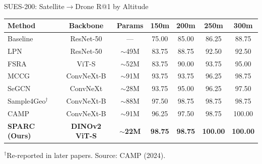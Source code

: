 \documentclass[aspectratio=169, 11pt]{beamer}
\begin{document}
\begin{frame}{SUES-200: Satellite$\to$Drone R@1 by Altitude}
\footnotesize
\centering
\begin{tabular}{@{}l c c c c c c@{}}
  \toprule
  \textbf{Method} & \textbf{Backbone} & \textbf{Params} & \textbf{150m} & \textbf{200m} & \textbf{250m} & \textbf{300m} \\
  \midrule
  Baseline & ResNet-50 & --- & 75.00 & 85.00 & 86.25 & 88.75 \\
  LPN & ResNet-50 & $\sim$49M & 83.75 & 88.75 & 92.50 & 92.50 \\
  FSRA & ViT-S & $\sim$52M & 83.75 & 90.00 & 93.75 & 95.00 \\
  MCCG & ConvNeXt-B & $\sim$91M & 93.75 & 93.75 & 96.25 & 98.75 \\
  SeGCN & ConvNeXt & $\sim$28M & 93.75 & 95.00 & 96.25 & 97.50 \\
  Sample4Geo$^\dagger$ & ConvNeXt-B & $\sim$88M & 97.50 & 98.75 & 98.75 & 98.75 \\
  CAMP & ConvNeXt-B & $\sim$91M & 96.25 & 97.50 & 98.75 & 100.00 \\
  \midrule
  \rowcolor{successgreen!20}
  \textbf{SPARC (Ours)} & \textbf{DINOv2 ViT-S} & \textbf{$\sim$22M} & \textbf{98.75} & \textbf{98.75} & \textbf{100.00} & \textbf{100.00} \\
  \bottomrule
\end{tabular}

\vspace{0.1cm}
{\tiny $^\dagger$Re-reported in later papers. Source: CAMP (2024).}
\end{frame}
\end{document}
